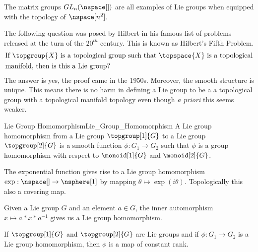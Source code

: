 \documentclass{book}                                                           %
\begin{document}
            \begin{example}
                The matrix groups $GL_{n}(\nspace[])$ are all examples of Lie
                groups when equipped with the topology of $\nspace[n^{2}]$.
            \end{example}
            The following question was posed by Hilbert in his famous list of
            problems released at the turn of the $20^{th}$ century. This is
            known as Hilbert's Fifth Problem.
            \begin{equation}
                \begin{split}
                    &\text{If }\topgroup{X}
                    \text{ is a topological group such that }
                    \topspace{X}\text{ is a topological}\\
                    &\text{manifold, then is this a Lie group?}
                \end{split}
            \end{equation}
            The answer is yes, the proof came in the 1950s. Moreover, the
            smooth structure is unique. This means there is no harm in defining
            a Lie group to be a a topological group with a topological manifold
            topology even though \textit{a priori} this seems weaker.
            \begin{fdefinition}{Lie Group Homomorphism}{Lie_Group_Homomorphism}
                A Lie group homomorphism from a Lie group
                $\topgroup[1]{G}$ to a Lie group $\topgroup[2]{G}$ is a smooth
                function $\phi:G_{1}\rightarrow{G}_{2}$ such that $\phi$ is a
                group homomorphism with respect to $\monoid[1]{G}$ and
                $\monoid[2]{G}$.
            \end{fdefinition}
            \begin{example}
                The exponential function gives rise to a Lie group homomorphism
                $\exp:\nspace[]\rightarrow\nsphere[1]$ by mapping
                $\theta\mapsto\exp(i\theta)$. Topologically this also a covering
                map.
            \end{example}
            \begin{example}
                Given a Lie group $G$ and an element $a\in{G}$, the inner
                automorphism $x\mapsto{a}*x*a^{\minus{1}}$ gives us a Lie group
                homomorphism.
            \end{example}
            \begin{theorem}
                If $\topgroup[1]{G}$ and $\topgroup[2]{G}$ are Lie groups and if
                $\phi:G_{1}\rightarrow{G}_{2}$ is a Lie group homomorphism, then
                $\phi$ is a map of constant rank.
            \end{theorem}
\end{document}
